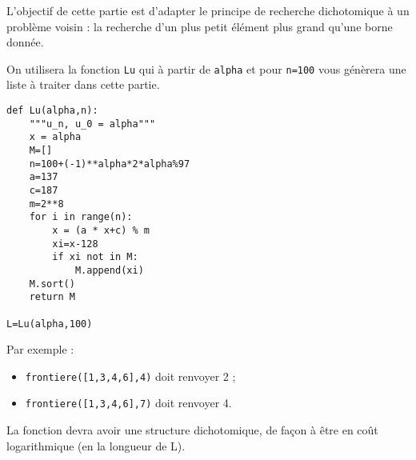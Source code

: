 L'objectif de cette partie est d'adapter le principe de recherche dichotomique à un problème
voisin : la recherche d'un plus petit  élément plus grand qu'une borne donnée.

On utilisera la fonction \texttt{Lu} qui à partir de \texttt{alpha} et pour \texttt{n=100} vous génèrera une liste à traiter dans cette partie.


\begin{lstlisting}
def Lu(alpha,n):
    """u_n, u_0 = alpha"""
    x = alpha
    M=[]
    n=100+(-1)**alpha*2*alpha%97
    a=137
    c=187
    m=2**8
    for i in range(n):
        x = (a * x+c) % m
        xi=x-128
        if xi not in M:
            M.append(xi)
    M.sort()
    return M
    
L=Lu(alpha,100)
\end{lstlisting}



Par exemple :
\begin{itemize}
\item \texttt{frontiere([1,3,4,6],4)} doit renvoyer 2 ;
\item \texttt{frontiere([1,3,4,6],7)} doit renvoyer 4.
\end{itemize}

La fonction devra avoir une structure dichotomique, de façon à être en coût logarithmique (en la longueur de L).


%
